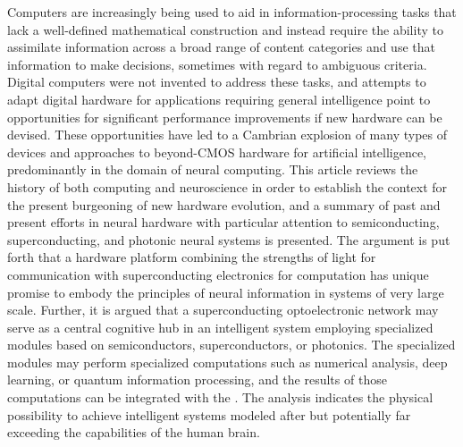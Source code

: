 Computers are increasingly being used to aid in information-processing tasks that lack a well-defined mathematical construction and instead require the ability to assimilate information across a broad range of content categories and use that information to make decisions, sometimes with regard to ambiguous criteria. Digital computers were not invented to address these tasks, and attempts to adapt digital hardware for applications requiring general intelligence point to opportunities for significant performance improvements if new hardware can be devised. These opportunities have led to a Cambrian explosion of many types of devices and approaches to beyond-CMOS hardware for artificial intelligence, predominantly in the domain of neural computing. This article reviews the history of both computing and neuroscience in order to establish the context for the present burgeoning of new hardware evolution, and a summary of past and present efforts in neural hardware with particular attention to semiconducting, superconducting, and photonic neural systems is presented. The argument is put forth that a hardware platform combining the strengths of light for communication with superconducting electronics for computation has unique promise to embody the principles of neural information in systems of very large scale. Further, it is argued that a superconducting optoelectronic network may serve as a central cognitive hub in an intelligent system employing specialized modules based on semiconductors, superconductors, or photonics. The specialized modules may perform specialized computations such as numerical analysis, deep learning, or quantum information processing, and the results of those computations can be integrated with the . The analysis indicates the physical possibility to achieve intelligent systems modeled after but potentially far exceeding the capabilities of the human brain.